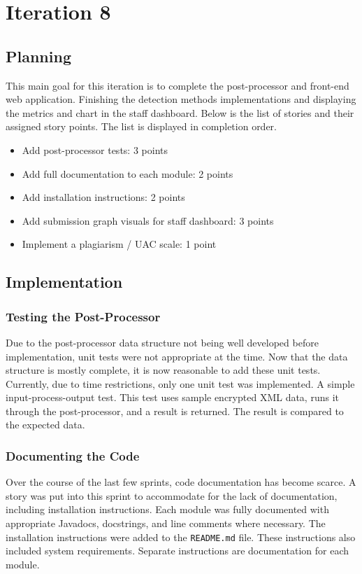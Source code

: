 \chapter{Iteration 8}
\label{it:8}
\section{Planning}
This main goal for this iteration is to complete the post-processor and front-end web application. Finishing the detection methods implementations and displaying the metrics and chart in the staff dashboard. Below is the list of stories and their assigned story points. The list is displayed in completion order.

\begin{itemize}
\item Add post-processor tests: 3 points
\item Add full documentation to each module: 2 points
\item Add installation instructions: 2 points
\item Add submission graph visuals for staff dashboard: 3 points
\item Implement a plagiarism / UAC scale: 1 point
\end{itemize}

\section{Implementation}
\subsection{Testing the Post-Processor}
Due to the post-processor data structure not being well developed before implementation, unit tests were not appropriate at the time. Now that the data structure is mostly complete, it is now reasonable to add these unit tests. Currently, due to time restrictions, only one unit test was implemented. A simple input-process-output test. This test uses sample encrypted XML data, runs it through the post-processor, and a result is returned. The result is compared to the expected data.

\subsection{Documenting the Code}
Over the course of the last few sprints, code documentation has become scarce. A story was put into this sprint to accommodate for the lack of documentation, including installation instructions. Each module was fully documented with appropriate Javadocs, docstrings, and line comments where necessary. The installation instructions were added to the \texttt{README.md} file. These instructions also included system requirements. Separate instructions are documentation for each module.

